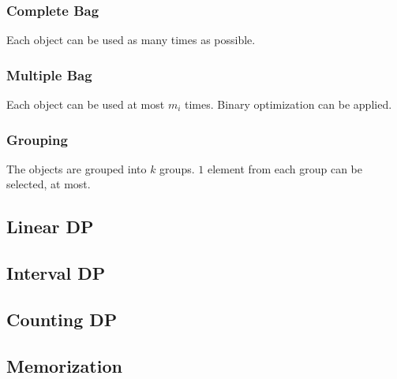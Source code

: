 \documentclass{article}
\begin{document}
\subsubsection{Complete Bag}

Each object can be used as many times as possible.

\subsubsection{Multiple Bag}

Each object can be used at most $m_i$ times. Binary optimization can be applied.

\subsubsection{Grouping}

The objects are grouped into $k$ groups. $1$ element from each group can be selected, at most.


\subsection{Linear DP}
\subsection{Interval DP}
\subsection{Counting DP}
\subsection{Memorization}
\end{document}
